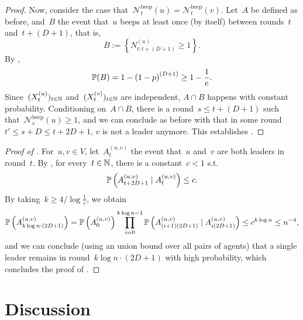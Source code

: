 \documentclass{article}
\newcommand{\beepcount}{\mathcal{N}^{\mathrm{beep}}}
\begin{document}
\begin{proof}
    Now, consider the case that~$\beepcount_t(u) = \beepcount_t(v)$. Let~$A$ be defined as before, and~$B$ the event that~$u$ beeps at least once (by itself) between rounds~$t$ and~$t+(D+1)$, that is,
    \begin{equation*}
        B := \left\{ N_{t:t+(D+1)}^{(u)} \geq 1 \right\}.
    \end{equation*}
    By ,
    \begin{equation*}
        \operatorname{\mathbb{P}}(B) = 1-\left( 1-p \right)^{(D+1)} \geq 1-\frac{1}{e}.
    \end{equation*}
    Since~$(X_t^{(u)})_{t \in \operatorname{\mathbb{N}}}$ and~$(X_t^{(v)})_{t \in \operatorname{\mathbb{N}}}$ are independent, $A \cap B$ happens with constant probability.
    Conditioning on~$A \cap B$, there is a round~$s \leq t+(D+1)$ such that~$\beepcount_s(u) \geq 1$, and we can conclude as before with  that in some round~$t' \leq s+D \leq t+2D+1$, $v$ is not a leader anymore.
    This establishes .
\end{proof}


\begin{proof} [Proof of ]
    For~$u,v \in V$, let~$A_t^{(u,v)}$ the event that~$u$ and~$v$ are both leaders in round~$t$. By , for every~$t \in \operatorname{\mathbb{N}}$, there is a constant~$c < 1$ s.t.
    \begin{equation*}
        \operatorname{\mathbb{P}} \left( A_{t+2D+1}^{(u,v)} \mid A_t^{(u,v)} \right) \leq c.
    \end{equation*}
    By taking~$k \geq 4/\log \frac{1}{c}$, we obtain
    \begin{equation*}
        \operatorname{\mathbb{P}}\left( A_{k \log n \cdot (2D+1)}^{(u,v)} \right) = \operatorname{\mathbb{P}} \left( A_0^{(u,v)} \right) \prod_{i=0}^{k \log n-1} \operatorname{\mathbb{P}} \left( A_{(i+1)(2D+1)}^{(u,v)} \mid A_{i(2D+1)}^{(u,v)} \right) \leq c^{k \log n} \leq n^{-4},
    \end{equation*}
    and we can conclude (using an union bound over all pairs of agents) that a single leader remains in round~$k \log n \cdot (2D+1)$ with high probability, which concludes the proof of .
\end{proof}



\section{Discussion}
\end{document}
